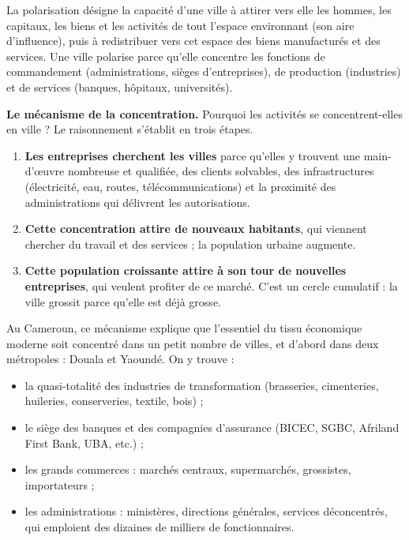 \documentclass[11pt]{article}
\newcommand{\cle}[1]{{\popxbold\color{popdark}#1}}
\begin{document}
\begin{definition}[Polarisation]
La \cle{polarisation} désigne la capacité d'une ville à attirer vers elle les hommes, les capitaux, les biens et les activités de tout l'espace environnant (son \cle{aire d'influence}), puis à redistribuer vers cet espace des biens manufacturés et des services. Une ville polarise parce qu'elle concentre les fonctions de commandement (administrations, sièges d'entreprises), de production (industries) et de services (banques, hôpitaux, universités).
\end{definition}

\textbf{Le mécanisme de la concentration.} Pourquoi les activités se concentrent-elles en ville ? Le raisonnement s'établit en trois étapes.

\begin{enumerate}
\item \textbf{Les entreprises cherchent les villes} parce qu'elles y trouvent une main-d'œuvre nombreuse et qualifiée, des clients solvables, des infrastructures (électricité, eau, routes, télécommunications) et la proximité des administrations qui délivrent les autorisations.
\item \textbf{Cette concentration attire de nouveaux habitants}, qui viennent chercher du travail et des services ; la population urbaine augmente.
\item \textbf{Cette population croissante attire à son tour de nouvelles entreprises}, qui veulent profiter de ce marché. C'est un cercle cumulatif : la ville grossit parce qu'elle est déjà grosse.
\end{enumerate}

Au Cameroun, ce mécanisme explique que l'essentiel du tissu économique moderne soit concentré dans un petit nombre de villes, et d'abord dans deux métropoles : Douala et Yaoundé. On y trouve :
\begin{itemize}
\item la quasi-totalité des \cle{industries} de transformation (brasseries, cimenteries, huileries, conserveries, textile, bois) ;
\item le siège des \cle{banques} et des compagnies d'assurance (BICEC, SGBC, Afriland First Bank, UBA, etc.) ;
\item les grands \cle{commerces} : marchés centraux, supermarchés, grossistes, importateurs ;
\item les \cle{administrations} : ministères, directions générales, services déconcentrés, qui emploient des dizaines de milliers de fonctionnaires.
\end{itemize}
\end{document}
